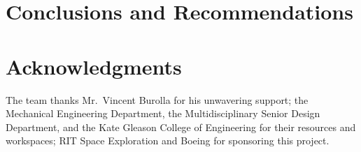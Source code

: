 \documentclass[journal]{IEEEtran}
\begin{document}
\section{Conclusions and Recommendations}

\section*{Acknowledgments}
The team thanks Mr.\ Vincent Burolla for his unwavering support; the Mechanical Engineering Department, the Multidisciplinary Senior Design Department, and the Kate Gleason College of Engineering for their resources and workspaces; RIT Space Exploration and Boeing for sponsoring this project.



\end{document}
